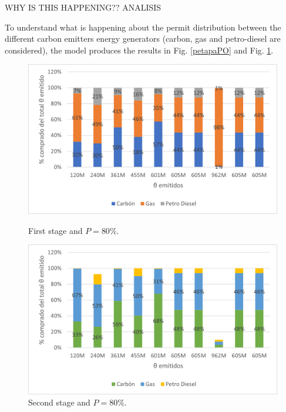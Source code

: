 \documentclass[a4paper,fleqn]{cas-dc}
\begin{document}
WHY IS THIS HAPPENING?? ANALISIS

To understand what is happening about the permit distribution between the different carbon emitters energy generators (carbon, gas and petro-diesel are considered), the model produces the results in Fig. \ref{petapaPO} and Fig. \ref{setapaPO}.

\begin{figure}[h]
  \centering
  \begin{minipage}[b]{0.49\textwidth}
    \includegraphics[width=\textwidth]{Submissions/EnergyPolicy/Images/distribucion primera etapa PO.png}
    \caption{{\footnotesize First stage and $P=80\%$.}}
    \label{petapaPO}
  \end{minipage}
  \hfill
  \begin{minipage}[b]{0.49\textwidth}
    \includegraphics[width=\textwidth]{docs/DocumentoMemoria/core/images/distribucion segunda etapa.png}
    \caption{{\footnotesize Second stage and $P=80\%$.}}
    \label{setapaPO}
  \end{minipage}
\end{figure}
\end{document}
